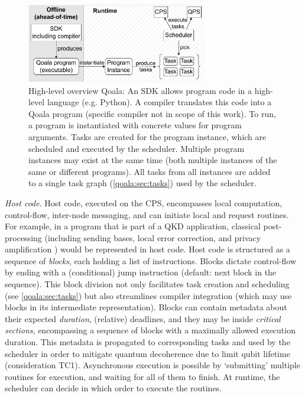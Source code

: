 \begin{figure}
    \centering
    \includegraphics[width=0.7\textwidth]{figures/qoala/runtime_overview.pdf}
    \caption{High-level overview Qoala: An SDK allows program code in a high-level language (e.g. Python).
    A compiler translates this code into a Qoala program (specific compiler not in scope of this work).
    To run, a program is instantiated with concrete values for program arguments.
    Tasks are created for the program instance, which are scheduled and executed by the scheduler.
    Multiple program instances may exist at the same time (both multiple instances of the same or different programs).
    All tasks from all instances are added to a single task graph (\cref{qoala:sec:tasks}) used by the scheduler.
    }
    \label{qoala:fig:runtime_overview}
\end{figure}




\textit{Host code}.
Host code, executed on the CPS, encompasses local computation, control-flow, inter-node messaging, and can initiate local and request routines.
For example, in a program that is part of a QKD application, classical post-processing (including sending bases, local error correction, and privacy amplification \cite{vidick2023introduction}) would be represented in host code.
Host code is structured as a sequence of \textit{blocks}, each holding a list of instructions.
Blocks dictate control-flow by ending with a (conditional) jump instruction (default: next block in the sequence).
This block division not only facilitates task creation and scheduling (see \cref{qoala:sec:tasks}) but also streamlines compiler integration (which may use blocks in its intermediate representation).
Blocks can contain metadata about their expected \textit{duration}, (relative) deadlines, and they may be inside \textit{critical sections}, encompassing a sequence of blocks with a maximally allowed execution duration. This metadata is propagated to corresponding tasks and used by the scheduler in order to mitigate quantum decoherence due to limit qubit lifetime (consideration TC1).
Asynchronous execution is possible by `submitting' multiple routines for execution, and waiting for all of them to finish. At runtime, the scheduler can decide in which order to execute the routines.


